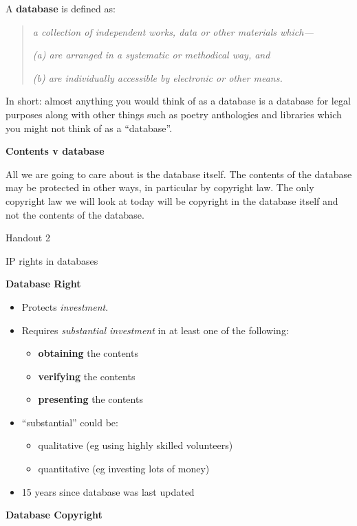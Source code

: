 \documentclass{article}
\begin{document}
A \textbf{database} is defined as:

\begin{quote}
\emph{a collection of independent works, data or other materials
which---}

\emph{(a) are arranged in a systematic or methodical way, and}

\emph{(b) are individually accessible by electronic or other means.}
\end{quote}

In short: almost anything you would think of as a database is a database
for legal purposes along with other things such as poetry anthologies
and libraries which you might not think of as a ``database''.

\textbf{Contents v database}

All we are going to care about is the database itself. The contents of
the database may be protected in other ways, in particular by copyright
law. The only copyright law we will look at today will be copyright in
the database itself and not the contents of the database.

Handout 2

IP rights in databases

\textbf{Database Right }

\begin{itemize}
\item
  Protects \emph{investment}.
\item
  Requires \emph{substantial investment} in at least one of the
  following:

  \begin{itemize}
  \item
    \textbf{obtaining} the contents
  \item
    \textbf{verifying} the contents
  \item
    \textbf{presenting} the contents
  \end{itemize}
\item
  ``substantial'' could be:

  \begin{itemize}
  \item
    qualitative (eg using highly skilled volunteers)
  \item
    quantitative (eg investing lots of money)
  \end{itemize}
\item
  15 years since database was last updated
\end{itemize}

\textbf{Database Copyright}
\end{document}
